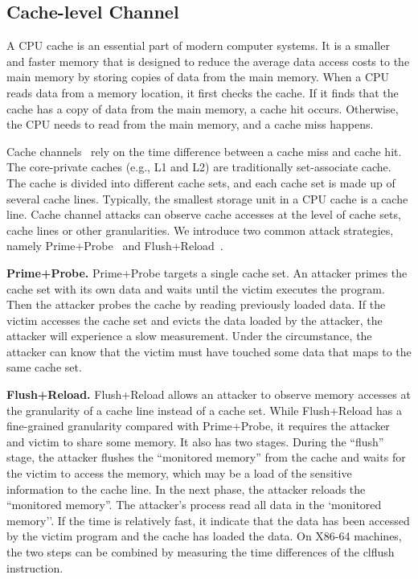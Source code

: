 \subsection{Cache-level Channel}
A CPU cache is an essential part of modern computer systems. It is a smaller and faster memory that is designed to reduce the average data access costs to the main memory by storing copies of data from the main memory. When a CPU reads data from a memory location, it first checks the cache. If it finds that the cache has a copy of data from the main memory, a cache hit occurs. Otherwise, the CPU needs to read from the main memory, and a cache miss happens.

Cache channels~\cite{yarom2017cachebleed,191010,184415,Osvik2006,liu2015last,184415} rely on the time difference between a cache miss and cache hit. The core-private caches (e.g., L1 and L2) are traditionally set-associate cache. The cache is divided into different cache sets, and each cache set is made up of several cache lines. Typically, the smallest storage unit in a CPU cache is a cache line. Cache channel attacks can observe cache accesses at the level of cache sets, cache lines or other granularities. We introduce two common attack strategies, namely Prime+Probe~\cite{liu2015last}  and Flush+Reload~\cite{yarom2014flush+}.

\textbf{Prime+Probe.} Prime+Probe targets a single cache set.
An attacker primes the cache set with its own data and waits until the victim executes the program. Then the attacker probes the cache by reading previously loaded data. If the victim accesses the cache set and evicts the data loaded by the attacker, the attacker will experience a slow measurement. Under the circumstance, the attacker can know that the victim must have touched some data that maps to the same cache set.

\textbf{Flush+Reload.} Flush+Reload allows an attacker to observe memory accesses at the granularity of a cache line instead of a cache set. While Flush+Reload has a fine-grained granularity compared with Prime+Probe, it requires the attacker and victim to share some memory. It also has two stages. During the ``flush'' stage, the attacker flushes the ``monitored
memory'' from the cache and waits for the victim to access the memory, which may be a load of the sensitive information to the cache line.  In the next phase,
the attacker reloads the ``monitored memory''. The attacker's process read all data in the `monitored
memory''. If the time is relatively fast, it indicate that the data has been accessed by the victim program and the cache has loaded the data. 
On X86-64 machines, the two steps can be combined by measuring the time differences of the \textsf{clflush} instruction.


